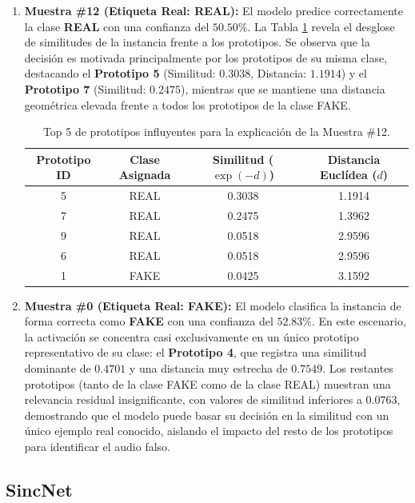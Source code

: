 \begin{enumerate}
    \item \textbf{Muestra \#12 (Etiqueta Real: REAL):} El modelo predice correctamente la clase \textbf{REAL} con una confianza del $50.50\%$. La Tabla \ref{tab:explicacion_m12} revela el desglose de similitudes de la instancia frente a los prototipos. Se observa que la decisión es motivada principalmente por los prototipos de su misma clase, destacando el \textbf{Prototipo 5} (Similitud: $0.3038$, Distancia: $1.1914$) y el \textbf{Prototipo 7} (Similitud: $0.2475$), mientras que se mantiene una distancia geométrica elevada frente a todos los prototipos de la clase FAKE.
    
    \begin{table}[h!]
    \centering
    \begin{tabular}{cccc}
    \toprule
    \textbf{Prototipo ID} & \textbf{Clase Asignada} & \textbf{Similitud ($\exp(-d)$)} & \textbf{Distancia Euclídea ($d$)} \\
    \midrule
    5 & REAL & 0.3038 & 1.1914 \\
    7 & REAL & 0.2475 & 1.3962 \\
    9 & REAL & 0.0518 & 2.9596 \\
    6 & REAL & 0.0518 & 2.9596 \\
    1 & FAKE & 0.0425 & 3.1592 \\
    \bottomrule
    \end{tabular}
    \caption{Top 5 de prototipos influyentes para la explicación de la Muestra \#12.}
    \label{tab:explicacion_m12}
    \end{table}

    \item \textbf{Muestra \#0 (Etiqueta Real: FAKE):} El modelo clasifica la instancia de forma correcta como \textbf{FAKE} con una confianza del $52.83\%$. En este escenario, la activación se concentra casi exclusivamente en un único prototipo representativo de su clase: el \textbf{Prototipo 4}, que registra una similitud dominante de $0.4701$ y una distancia muy estrecha de $0.7549$. Los restantes prototipos (tanto de la clase FAKE como de la clase REAL) muestran una relevancia residual insignificante, con valores de similitud inferiores a $0.0763$, demostrando que el modelo puede basar su decisión en la similitud con un único ejemplo real conocido, aislando el impacto del resto de los prototipos para identificar el audio falso.
\end{enumerate}

\subsection{SincNet}
\label{subsec:res_sincnet}

